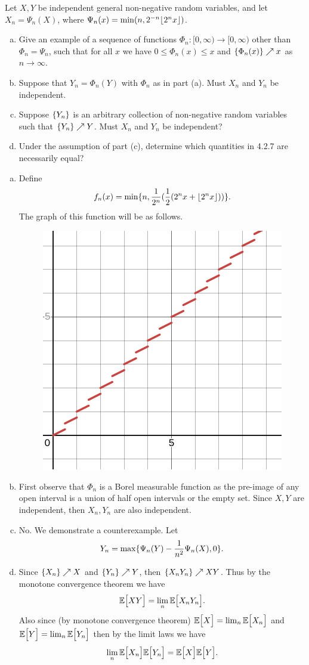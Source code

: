 \begin{problem}
	Let $ X,Y $ be independent general non-negative random variables, and let $ X_n = \Psi_n(X) $, where $ \Psi_n(x) = \min(n,2^{-n}\lfloor 2^nx \rfloor) $.
	\begin{enumerate}[(a)]
		\item Give an example of a sequence of functions $ \Phi_n: [0,\infty) \to [0,\infty) $ other than $ \Phi_n = \Psi_n $, such that for all $ x $ we have $ 0 \leq \Phi_n(x) \leq x $ and $ \{\Phi_n(x)\}\nearrow x $ as $ n \to \infty $.
		\item Suppose that $ Y_n = \Phi_n(Y) $ with $ \Phi_n $ as in part (a). Must $ X_n $ and $ Y_n $ be independent.
		\item Suppose $ \{Y_n\} $ is an arbitrary collection of non-negative random variables such that $ \{Y_n\} \nearrow Y $. Must $ X_n $ and $ Y_n $ be independent?
		
		\item Under the assumption of part (c), determine which quantities in 4.2.7 are necessarily equal?
	\end{enumerate}
\end{problem}
\begin{solution}
	\begin{enumerate}[(a)]
		\item Define
		\[ f_n(x) = \min\{n, \frac{1}{2^n}(\frac{1}{2}(2^n x + \lfloor 2^n x \rfloor)) \}. \] 
		The graph of this function will be as follows.
		\begin{figure}[h!]
			\centering
			\includegraphics[width=0.2\linewidth]{Images/PhiFunction}
			\label{fig:phifunction}
		\end{figure}
		\FloatBarrier
		
		\item First observe that $ \Phi_n $ is a Borel measurable function as the pre-image of any open interval is a union of half open intervals or the empty set. Since $ X,Y $ are independent, then $ X_n, Y_n $ are also independent.
		
		\item No. We demonstrate a counterexample. Let 
		\[ Y_n = \max\{\Psi_n(Y) - \frac{1}{n^2}\Psi_n(X) , 0\}. \]
		
		\item Since $ \{X_n\} \nearrow X $ and $ \{Y_n \} \nearrow Y $, then $ \{X_n Y_n\} \nearrow XY $. Thus by the monotone convergence theorem we have
		\[ \mathbb{E}\big[XY\big] = \lim_n \mathbb{E}\big[X_n Y_n\big]. \]
		Also since (by monotone convergence theorem) $ \mathbb{E}\big[X\big] = \lim_n \mathbb{E}\big[X_n\big] $ and $ \mathbb{E}\big[Y\big] = \lim_n \mathbb{E}\big[Y_n\big] $ then by the limit laws we have
		\[ \lim_n \mathbb{E}\big[X_n\big] \mathbb{E}\big[Y_n\big] = \mathbb{E}\big[X\big] \mathbb{E}\big[Y\big]. \]
		
	\end{enumerate}
\end{solution}


